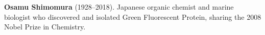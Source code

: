 \nobelchemistry \textbf{Osamu Shimomura} (1928–2018). Japanese organic chemist and marine biologist who discovered and isolated Green Fluorescent Protein, sharing the 2008 Nobel Prize in Chemistry.

